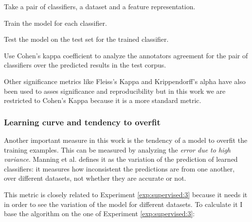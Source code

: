 \begin{metric}\label{met:2}
  \begin{enummet}
    \item Take a pair of classifiers, a dataset and a feature representation.
    \item Train the model for each classifier.
    \item Test the model on the test set for the trained classifier.
    \item Use Cohen's kappa coefficient to analyze the annotators agreement for
      the pair of classifiers over the predicted results in the test corpus.
  \end{enummet}
\end{metric}

Other significance metrics like Fleiss's Kappa \cite{fleiss1971mns} and
Krippendorff's alpha \cite{doi:10.1177/001316447003000105} have also been used
to asses significance and reproducibility but in this work we are restricted to
Cohen's Kappa because it is a more standard metric.

\subsubsection{Learning curve and tendency to
overfit}\label{sec:supervised:overfit:metrics}

Another important measure in this work is the tendency of a model to overfit
the training examples. This can be measured by analyzing the {\em error due to
high variance}. Manning et al. \cite{Manning:2008:IIR:1394399} defines it as
the variation of the prediction of learned classifiers: it measures how
inconsistent the predictions are from one another, over different datasets, not
whether they are accurate or not. 

%

This metric is closely related to Experiment \ref{exp:supervised:3} because it
needs it in order to see the variation of the model for different datasets. To
calculate it I base the algorithm on the one of Experiment
\ref{exp:supervised:3}:

